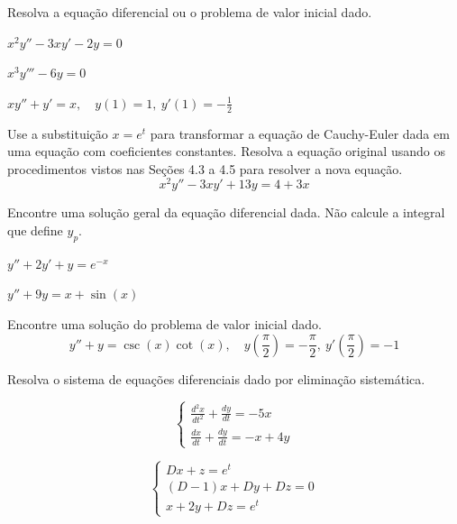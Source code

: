 \documentclass[oneside,12pt,a4paper]{report}
\begin{document}
 Resolva a equação diferencial ou o problema de valor inicial dado.
\begin{itensquestao}[2]
    \item $x^2y''-3xy'-2y=0$
    \item $x^3y'''-6y=0$
    \item $xy''+y'=x,\quad y(1)=1,~y'(1)=-\frac{1}{2}$
\end{itensquestao}

 Use a substituição $x=e^t$ para transformar a equação de Cauchy-Euler dada em uma equação com coeficientes constantes. Resolva a equação original usando os procedimentos vistos nas Seções 4.3 a 4.5 para resolver a nova equação.
\[x^2y''-3xy'+13y=4+3x\]

 Encontre uma solução geral da equação diferencial dada. Não calcule a integral que define $y_p$.
\begin{itensquestao}[2]
    \item $y''+2y'+y=e^{-x}$
    \item $y''+9y=x+\sin(x)$
\end{itensquestao}

 Encontre uma solução do problema de valor inicial dado.
\[y''+y=\csc(x)\cot(x),\quad y\left(\frac{\pi}{2}\right)=-\frac{\pi}{2},~y'\left(\frac{\pi}{2}\right)=-1\]

 Resolva o sistema de equações diferenciais dado por eliminação sistemática.
\begin{itensquestao}[2]
    \item \[\begin{cases}\displaystyle\frac{d^2x}{dt^2}+\frac{dy}{dt}=-5x\\\displaystyle
    \frac{dx}{dt}+\frac{dy}{dt}=-x+4y\end{cases}\]
    \item \[\begin{cases}Dx+z=e^t\\(D-1)x+Dy+Dz=0\\x+2y+Dz=e^t\end{cases}\]
\end{itensquestao}
\end{document}
